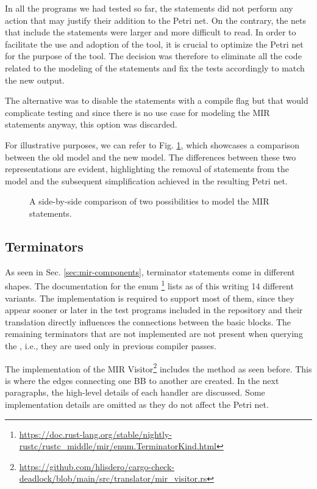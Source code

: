In all the programs we had tested so far, the statements did not perform any action
that may justify their addition to the Petri net.
On the contrary, the nets that include the statements were larger and more difficult to read.
In order to facilitate the use and adoption of the tool,
it is crucial to optimize the Petri net for the purpose of the tool.
The decision was therefore to eliminate all the code related to the modeling of the statements
and fix the tests accordingly to match the new output.

The alternative was to disable the statements with a compile flag
but that would complicate testing and
since there is no use case for modeling the \acrshort{MIR} statements anyway, this option was discarded.

For illustrative purposes, we can refer to Fig. \ref{fig:statement-model-comparison},
which showcases a comparison between the old model and the new model.
The differences between these two representations are evident,
highlighting the removal of statements from the model and
the subsequent simplification achieved in the resulting Petri net.

\begin{figure}[!htb]
  \centering
  
  \caption{A side-by-side comparison of two possibilities to model the MIR statements.}
  \label{fig:statement-model-comparison}
\end{figure}

\subsection{Terminators}
\label{sec:terminators}

As seen in Sec. \ref{sec:mir-components}, terminator statements come in different shapes.
The documentation for the enum \footnote{\url{https://doc.rust-lang.org/stable/nightly-rustc/rustc_middle/mir/enum.TerminatorKind.html}}
lists as of this writing 14 different variants.
The implementation is required to support most of them,
since they appear sooner or later in the test programs included in the repository
and their translation directly influences the connections between the basic blocks.
The remaining terminators that are not implemented are not present
when querying the , i.e., they are used only in previous compiler passes.

The implementation of the MIR
Visitor\footnote{\url{https://github.com/hlisdero/cargo-check-deadlock/blob/main/src/translator/mir_visitor.rs}}
includes the  method as seen before.
This is where the edges connecting one \acrshort{BB} to another are created.
In the next paragraphs, the high-level details of each handler are discussed.
Some implementation details are omitted as they do not affect the Petri net.

